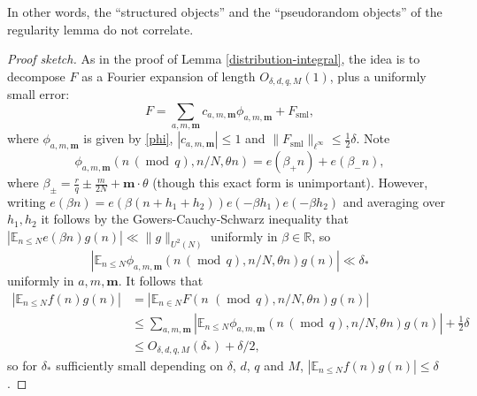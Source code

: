 \documentclass[10pt,reqno]{amsart}
\theoremstyle{definition}
\theoremstyle{remark}
\newcommand{\md}[1]{\ensuremath{\,(\operatorname{mod}\, #1)}}
\renewcommand{\leq}{\leqslant}
\newcommand\sml{\operatorname{sml}}
\def\R{\mathbb{R}}
\def\E{\mathbb{E}}
\numberwithin{equation}{section}
\begin{document}
In other words, the ``structured objects'' and the ``pseudorandom objects'' of the regularity lemma do not correlate.

\begin{proof}[Proof sketch]
As in the proof of Lemma \ref{distribution-integral}, the idea is to decompose $F$ as a Fourier expansion of length $O_{\delta, d, q, M}(1)$, plus a uniformly small error:
\[ F = \sum_{a, m, \mathbf{m}} c_{a, m, \mathbf{m}} \phi_{a, m, \mathbf{m}}  + F_{\sml}, \]
where $\phi_{a,m,\mathbf{m}}$ is given by \eqref{phi}, $|c_{a, m, \mathbf{m}}| \leq 1$ and $\|F_{\sml}\|_{\ell^\infty} \leq \tfrac{1}{2}\delta$. Note
\begin{equation}\label{eq77}
  \phi_{a,m,\mathbf{m}}(n \md{q}, n/N, \theta n) = e(\beta_+ n) + e(\beta_- n),
\end{equation}
where $\beta_\pm = \frac{r}{q} \pm \frac{m}{2N} + \mathbf{m} \cdot \theta$ (though this exact form is unimportant). However, writing $e(\beta n) = e(\beta (n + h_1 + h_2)) e(-\beta h_1) e(-\beta h_2)$ and averaging over $h_1, h_2$ it follows by the Gowers-Cauchy-Schwarz inequality \cite[Chapter 11]{tv} that $|\E_{n \leq N} e(\beta n) g(n)| \ll \| g \|_{U^2(N)}$ uniformly in $\beta \in \R$, so
\[ \left|\E_{n\leq N} \phi_{a,m,\mathbf{m}}(n\md q, n/N,\theta n) g(n)\right| \ll \delta_* \]
uniformly in $a,m,\mathbf{m}$. It follows that
\begin{align*}
	\left| \E_{n \leq N} f(n) g(n) \right|
	&= \left| \E_{n \in N} F(n\, \md{q}, n / N, \theta n) g(n) \right| \\
	&\leq \sum_{a,m,\mathbf{m}} \left|\E_{n\leq N} \phi_{a,m,\mathbf{m}}(n\md q,n/N,\theta n) g(n)\right| + \tfrac{1}{2}\delta\\
  &\leq O_{\delta, d, q, M}(\delta_*) + \delta / 2,
\end{align*}
so for $\delta_*$ sufficiently small depending on $\delta$, $d$, $q$ and $M$, $|\E_{n\leq N}f(n)g(n)|\leq\delta$.
\end{proof}
\end{document}
